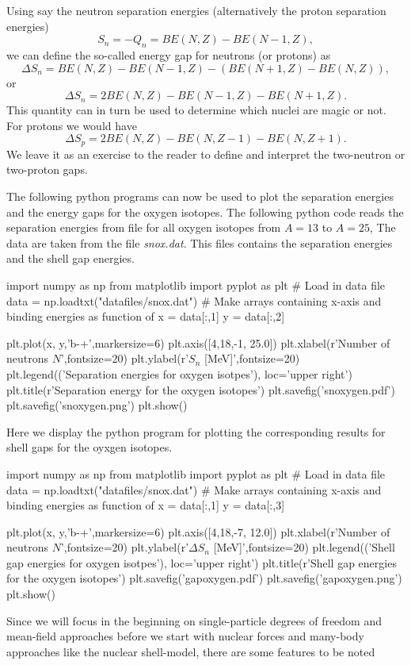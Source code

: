 \documentclass[%
twoside,                 %
final,                   %
10pt]{article}
\begin{document}
Using say the neutron separation energies (alternatively the proton separation energies)
\[
S_n= -Q_n= BE(N,Z)-BE(N-1,Z),
\]
we can define the so-called energy gap for neutrons (or protons) as 
\[
\Delta S_n= BE(N,Z)-BE(N-1,Z)-\left(BE(N+1,Z)-BE(N,Z)\right),
\]
or 
\[
\Delta S_n= 2BE(N,Z)-BE(N-1,Z)-BE(N+1,Z).
\]
This quantity can in turn be used to determine which nuclei are magic or not. 
For protons we would have 
\[
\Delta S_p= 2BE(N,Z)-BE(N,Z-1)-BE(N,Z+1).
\]
We leave it as an exercise to the reader to define and interpret the two-neutron or two-proton gaps. 


The following python programs can now be used to plot the separation energies and the energy gaps for the oxygen isotopes.  The following python code reads the separation energies from file for all oxygen isotopes from $A=13$ to $A=25$, The data are taken from the file \emph{snox.dat}.  This files contains the separation energies and the shell gap energies.
\bpypro

import numpy as np
from  matplotlib import pyplot as plt
# Load in data file
data = np.loadtxt("datafiles/snox.dat")
# Make arrays containing x-axis and binding energies as function of
x = data[:,1]
y = data[:,2]

plt.plot(x, y,'b-+',markersize=6)
plt.axis([4,18,-1, 25.0])
plt.xlabel(r'Number of neutrons $N$',fontsize=20)
plt.ylabel(r'$S_n$ [MeV]',fontsize=20)
plt.legend(('Separation energies for oxygen isotpes'), loc='upper right')
plt.title(r'Separation energy for the oxygen isotopes')
plt.savefig('snoxygen.pdf')
plt.savefig('snoxygen.png')
plt.show()
\epypro


Here we display the python program for plotting the corresponding results for shell gaps for the oyxgen isotopes. 
\bpypro

import numpy as np
from  matplotlib import pyplot as plt
# Load in data file
data = np.loadtxt("datafiles/snox.dat")
# Make arrays containing x-axis and binding energies as function of
x = data[:,1]
y = data[:,3]

plt.plot(x, y,'b-+',markersize=6)
plt.axis([4,18,-7, 12.0])
plt.xlabel(r'Number of neutrons $N$',fontsize=20)
plt.ylabel(r'$\Delta S_n$ [MeV]',fontsize=20)
plt.legend(('Shell gap energies for oxygen isotpes'), loc='upper right')
plt.title(r'Shell gap energies for the oxygen isotopes')
plt.savefig('gapoxygen.pdf')
plt.savefig('gapoxygen.png')
plt.show()
\epypro





Since we will focus in the beginning on single-particle degrees of freedom and mean-field approaches before we
start with nuclear forces and many-body approaches like the nuclear shell-model, there are some features to be noted
\end{document}
